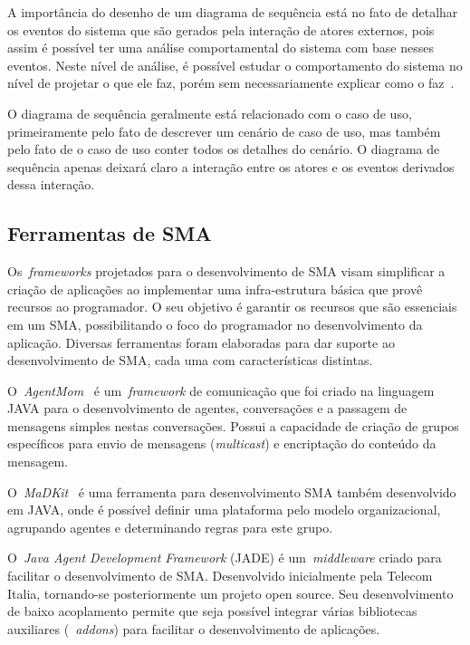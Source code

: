 A importância do desenho de um diagrama de sequência está no fato de detalhar os eventos do sistema que são gerados pela interação de atores externos, pois assim é possível ter uma análise comportamental do sistema com base nesses eventos. Neste nível de análise, é possível estudar o comportamento do sistema no nível de projetar o que ele faz, porém sem necessariamente explicar como o faz~\cite{larman08}.

O diagrama de sequência geralmente está relacionado com o caso de uso, primeiramente pelo fato de descrever um cenário de caso de uso, mas também pelo fato de o caso de uso conter todos os detalhes do cenário. O diagrama de sequência apenas deixará claro a interação entre os atores e os eventos derivados dessa interação.

\subsection{Ferramentas de SMA}

Os~\emph{frameworks} projetados para o desenvolvimento de SMA visam simplificar a criação de aplicações ao implementar uma infra-estrutura básica que provê recursos ao programador. O seu objetivo é garantir os recursos que são essenciais em um SMA, possibilitando o foco do programador no desenvolvimento da aplicação. Diversas ferramentas foram elaboradas para dar suporte ao desenvolvimento de SMA, cada uma com características distintas.

O~\emph{AgentMom}~\cite{agentMom} é um~\emph{framework} de comunicação que foi criado na linguagem JAVA para o desenvolvimento de agentes, conversações e a passagem de mensagens simples nestas conversações. Possui a capacidade de criação de grupos específicos para envio de mensagens (\emph{multicast}) e encriptação do conteúdo da mensagem.

O~\emph{MaDKit}~\cite{madkit} é uma ferramenta para desenvolvimento SMA também desenvolvido em JAVA, onde é possível definir uma plataforma pelo modelo organizacional, agrupando agentes e determinando regras para este grupo.

O~\emph{Java Agent Development Framework} (JADE) é um~\emph{middleware} criado para facilitar o desenvolvimento de SMA. Desenvolvido inicialmente pela Telecom Italia, tornando-se posteriormente um projeto open source. Seu desenvolvimento de baixo acoplamento permite que seja possível integrar várias bibliotecas auxiliares (~\emph{addons}) para facilitar o desenvolvimento de aplicações.

